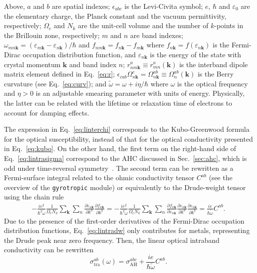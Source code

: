 Above, $a$ and $b$ are spatial indexes; $\epsilon_{abc}$ is the Levi-Civita symbol; $e$, $\hbar$ and $\varepsilon_{0}$ are the elementary charge, the Planck constant and the vacuum permittivity, respectively; $\Omega_{c}$ and $N_{k}$ are the unit-cell volume and the number of $k$-points in the Brillouin zone, respectively; $m$ and $n$ are band indexes; $\omega_{mn\mathbf{k}}=(\varepsilon_{m\mathbf{k}}-\varepsilon_{n\mathbf{k}})/\hbar$ and $f_{nm\mathbf{k}}=f_{n\mathbf{k}}-f_{m\mathbf{k}}$ where $f_{n\mathbf{k}}=f(\varepsilon_{n\mathbf{k}})$ is the Fermi-Dirac occupation distribution function, and $\varepsilon_{n\mathbf{k}}$ is the energy of the state with crystal momentum $\mathbf{k}$ and band index $n$; $r^{a}_{nm\mathbf{k}}\equiv r^{a}_{mn}(\mathbf{k})$ is the interband dipole matrix element defined in Eq.~\ref{eq:r}; $\epsilon_{cab}\Omega^{c}_{n\mathbf{k}}=\Omega^{ab}_{n\mathbf{k}}\equiv\Omega^{ab}_{n}(\mathbf{k})$ is the Berry curvature (see Eq.~\ref{eq:curv}); and $\tilde{\omega}=\omega+i\eta/\hbar$ where $\omega$ is the optical frequency and $\eta>0$ is an adjustable smearing parameter with units of energy. Physically, the latter can be related with the lifetime or relaxation time of electrons to account for damping effects.

The expression in Eq.~\ref{eq:linterchi} corresponds to the Kubo-Greenwood formula for the optical susceptibility, instead of that for the optical conductivity presented in Eq.~\ref{eq:kubo}. On the other hand, the first term on the right-hand side of Eq.~\ref{eq:lintrasigma} correspond to the AHC discussed in Sec.~\ref{sec:ahc}, which is odd under time-reversal symmetry~\cite{wang-prb06}. The second term can be rewritten as a Fermi-surface integral related to the ohmic conductivity tensor $C^{ab}$ (see the overview of the \verb|gyrotropic| module) or equivalently to the Drude-weight tensor~\cite{PhysRevB.102.205123} using the chain rule
\begin{equation}\label{eq:lintradw}
 \begin{split}
  -\frac{ie^{2}}{\hbar^{2}\tilde{\omega}}\frac{1}{\Omega_{c}N_{k}}\sum_{\mathbf{k}}\sum_{n}\frac{\partial\varepsilon_{n\mathbf{k}}}{\partial k^{a}}\frac{\partial f_{n\mathbf{k}}}{\partial k^{b}}=-\frac{ie^{2}}{\hbar^{2}\tilde{\omega}}\frac{1}{\Omega_{c}N_{k}}\sum_{\mathbf{k}}\sum_{n}\frac{\partial f_{n\mathbf{k}}}{\partial\varepsilon_{n\mathbf{k}}}\frac{\partial\varepsilon_{n\mathbf{k}}}{\partial k^{a}}\frac{\partial\varepsilon_{n\mathbf{k}}}{\partial k^{b}}=\frac{ie}{\hbar\tilde{\omega}}C^{ab}.
 \end{split}
\end{equation}
Due to the presence of the first-order derivatives of the Fermi-Dirac occupation distribution functions, Eq.~\ref{eq:lintradw} only contributes for metals, representing the Drude peak near zero frequency. Then, the linear optical intraband conductivity can be rewritten
\begin{equation}
 \sigma^{ab}_{\mathrm{tra}}(\omega)=\sigma_{\mathrm{AH}}^{abc}+\frac{ie}{\hbar\tilde{\omega}}C^{ab}.
\end{equation}

